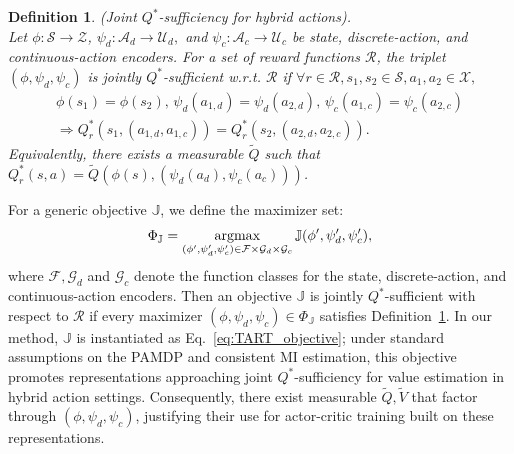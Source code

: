\newtheorem{definition}{Definition}
\begin{definition}
    (Joint $Q^*$-sufficiency for hybrid actions).\\
    Let $\phi: \mathcal{S} \rightarrow \mathcal{Z}$, $\psi_d : \mathcal{A}_d \rightarrow \mathcal{U}_d,$ and $\psi_c: \mathcal{A}_c \rightarrow \mathcal{U}_c$ be state, discrete-action, and continuous-action encoders.
    For a set of reward functions $\mathcal{R}$, the triplet $(\phi, \psi_d, \psi_c)$ is jointly $Q^*$-sufficient w.r.t. $\mathcal{R}$ if $\forall r \in \mathcal{R}, s_1, s_2 \in \mathcal{S}, a_1, a_2 \in \mathcal{X},$ 
\begin{equation*}
\begin{aligned}
    \phi(s_1)=\phi(s_2), \, \psi_d(a_{1, d})=\psi_d(a_{2,d}), \, \psi_c(a_{1, c})=\psi_c(a_{2, c}) \\ \Rightarrow Q_r^*(s_1, (a_{1, d}, a_{1, c})) = Q_r^*(s_2, (a_{2, d}, a_{2, c})).
\end{aligned}
\end{equation*}
Equivalently, there exists a measurable $\tilde{Q}$ such that $Q_r^*(s, a)=\tilde{Q}(\phi(s), (\psi_d(a_d), \psi_c(a_c)))$.
\label{def:1}
\end{definition}
For a generic objective $\mathbb{J}$, we define the maximizer set:
\begin{equation}
    \Phi_\mathbb{J} = \argmax_{(\phi', \psi'_d, \psi'_c) \in \mathcal{F} \times \mathcal{G}_d \times \mathcal{G}_c} \mathbb{J}(\phi', \psi'_d, \psi'_c),
\end{equation}
where $\mathcal{F}, \mathcal{G}_d$ and $\mathcal{G}_c$ denote the function classes for the state, discrete-action, and continuous-action encoders.
Then an objective $\mathbb{J}$ is jointly $Q^*$-sufficient with respect to $\mathcal{R}$ if every maximizer $(\phi, \psi_d, \psi_c) \in \Phi_\mathbb{J}$ satisfies Definition~\ref{def:1}.
In our method, $\mathbb{J}$ is instantiated as Eq.~\eqref{eq:TART_objective}; under standard assumptions on the PAMDP and consistent MI estimation, this objective promotes representations approaching joint $Q^*$-sufficiency for value estimation in hybrid action settings.
Consequently, there exist measurable $\tilde{Q}, \tilde{V}$ that factor through $(\phi, \psi_d, \psi_c)$, justifying their use for actor-critic training built on these representations.